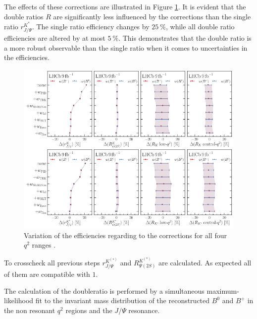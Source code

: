 The effects of these corrections are illustrated in Figure \ref{fig:weights}. 
It is evident that the double ratios $R$ are significantly less influenced by the corrections 
than the single ratio $r^{K^*}_{J/\Psi}$. The single ratio efficiency changes by $\SI{25}{\%}$, 
while all double ratio efficiencies are altered by at most $\SI{5}{\%}$. This demonstrates that 
the double ratio is a more robust observable than the single ratio when it comes to uncertainties 
in the efficiencies.

\begin{figure}
    \centering
    \includegraphics[width=\linewidth]{figures/weights.png}
    \caption{Variation of the efficiencies regarding to the corrections for all four $q^2$ ranges \cite{lhcbcollaboration2022test}.}
    \label{fig:weights}
\end{figure}
To crosscheck all previous steps $r^{K^{(*)}}_{J/\Psi}$ and $R^{K^{(*)}}_{\Psi(2S)}$ are 
calculated. As expected all of them are compatible with $\num{1}$.

The calculation of the doubleratio is performed by a simultaneous maximum-likelihood 
fit to the invariant mass distribution of the reconstructed $B^0$ and $B^+$ in the 
non resonant $q^2$ regions and the $J/\Psi$ resonance. 

